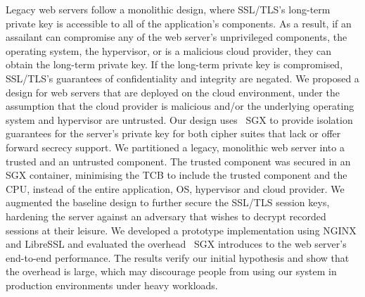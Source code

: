\documentclass[../main.tex]{subfiles}
\begin{document}
Legacy web servers follow a monolithic design, where SSL/TLS's
long-term private key is accessible to all of the application's
components. As a result, if an assailant can compromise any of the web
server's unprivileged components, the operating system, the
hypervisor, or is a malicious cloud provider, they can obtain the
long-term private key. If the long-term private key is compromised,
SSL/TLS's guarantees of confidentiality and integrity are negated. We
proposed a design for web servers that are deployed on the cloud
environment, under the assumption that the cloud provider is malicious
and/or the underlying operating system and hypervisor are untrusted.
Our design uses \Intel~SGX to provide isolation guarantees for the
server's private key for both cipher suites that lack or offer forward
secrecy support. We partitioned a legacy, monolithic web server into a
trusted and an untrusted component. The trusted component was secured
in an SGX container, minimising the TCB to include the trusted
component and the CPU, instead of the entire application, OS,
hypervisor and cloud provider. We augmented the baseline design to
further secure the SSL/TLS session keys, hardening the server against
an adversary that wishes to decrypt recorded sessions at their
leisure. We developed a prototype implementation using NGINX and
LibreSSL and evaluated the overhead \Intel~SGX introduces to the web
server's end-to-end performance. The results verify our initial
hypothesis and show that the overhead is large, which may discourage
people from using our system in production environments under heavy
workloads.
\end{document}
